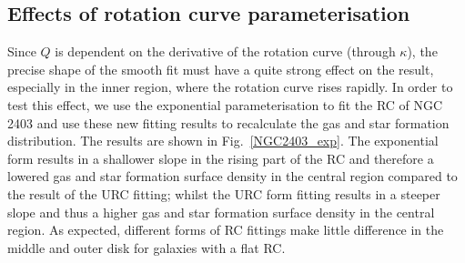 \documentclass[12pt,preprint]{aastex}
\begin{document}
\subsection{Effects of rotation curve parameterisation}
\label{rcs}
Since $Q$ is dependent on the derivative of the rotation curve (through $\kappa$), 
the precise shape of the smooth fit must have a quite strong effect on the result, especially in the inner region,
where the rotation curve rises rapidly. In order to test this effect, we use the exponential parameterisation to fit the RC of NGC 2403  and use these new fitting results to recalculate the gas and star formation distribution. The results are shown in Fig.~\ref{NGC2403_exp}. The exponential form results in a shallower slope in the rising part of the RC and therefore a lowered gas and star formation surface density in the central region compared to the result of the URC fitting; whilst the URC form fitting results in a steeper slope and thus a higher gas and star formation surface density in the central region.   As expected, different forms of RC fittings make little difference in the middle and outer disk for galaxies with a flat RC.
\end{document}
